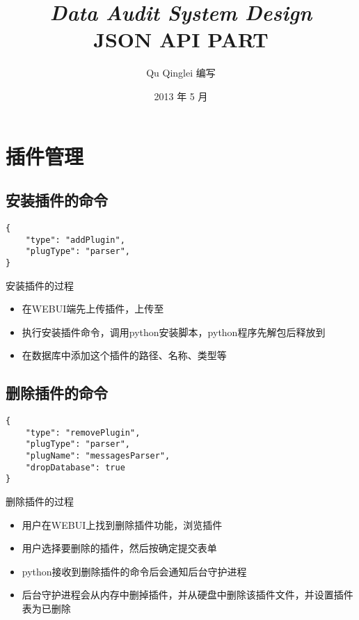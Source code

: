 \documentclass{article}
\begin{document}
\title{%
  {\huge \textit{Data Audit System Design}\\\smallskip}%
  {\LARGE \textsf{JSON API PART}}
}

\author{Qu Qinglei 编写 \\[3mm]
       }

\date{2013 年 5 月}

\maketitle

\begin{multicols}{2}
\tableofcontents
\end{multicols}

\section{插件管理}
\subsection{安装插件的命令}
\begin{verbatim}
{
    "type": "addPlugin",
    "plugType": "parser",
}
\end{verbatim}
\textsf{安装插件的过程}
\begin{itemize}
\item[(1)] 在WEBUI端先上传插件，上传至
\item[(2)] 执行安装插件命令，调用python安装脚本，python程序先解包后释放到
\item[(3)] 在数据库中添加这个插件的路径、名称、类型等
\end{itemize}

\subsection{删除插件的命令}
\begin{verbatim}
{
    "type": "removePlugin",
    "plugType": "parser",
    "plugName": "messagesParser",
    "dropDatabase": true
}
\end{verbatim}
\textsf{删除插件的过程}
\begin{itemize}
\item[(1)] 用户在WEBUI上找到删除插件功能，浏览插件
\item[(2)] 用户选择要删除的插件，然后按确定提交表单
\item[(3)] python接收到删除插件的命令后会通知后台守护进程
\item[(4)] 后台守护进程会从内存中删掉插件，并从硬盘中删除该插件文件，并设置插件表为已删除
\end{itemize}
\end{document}
